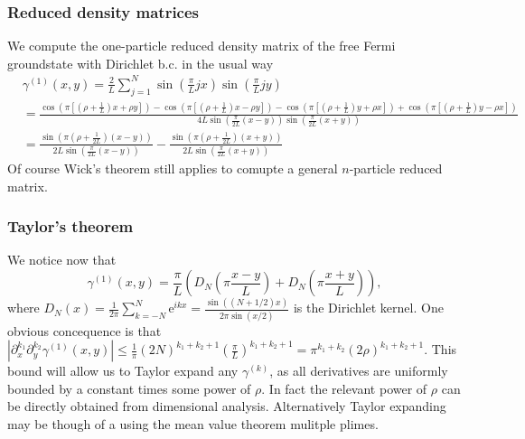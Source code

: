 \documentclass[a4paper,11pt]{article}
\newcommand{\euler}[1]{\text{e}^{#1}}
\newcommand{\abs}[1]{\left\lvert #1 \right\rvert}
\numberwithin{equation}{section}
\begin{document}
	\subsubsection{Reduced density matrices}
	We compute the one-particle reduced density matrix of the free Fermi groundstate with Dirichlet b.c. in the usual way\begin{equation}
	\begin{aligned}
	&\gamma^{(1)}(x,y)=\frac{2}{L}\sum_{j=1}^{N}\sin\left(\frac{\pi}{L}jx\right)\sin\left(\frac{\pi}{L} jy\right)\\
	&=\frac{\cos\left(\pi\left[ \left(\rho+\frac{1}{L}\right)x+\rho y\right]\right)-\cos\left(\pi \left[\left(\rho+\frac{1}{L}\right)x-\rho y\right]\right)-\cos\left(\pi \left[\left(\rho+\frac{1}{L}\right)y+\rho x\right]\right)+\cos\left(\pi \left[\left(\rho+\frac{1}{L}\right)y-\rho x\right]\right)}{4L\sin\left(\frac{\pi}{2L}(x-y)\right)\sin\left(\frac{\pi}{2L}(x+y)\right)}\\
	&=\frac{\sin\left(\pi\left(\rho+\frac{1}{2L}\right)(x-y)\right)}{2L\sin\left(\frac{\pi}{2L}(x-y)\right)}-\frac{\sin\left(\pi\left(\rho+\frac{1}{2L}\right)(x+y)\right)}{2L\sin\left(\frac{\pi}{2L}(x+y)\right)}
	\end{aligned}
	\end{equation}
	Of course Wick's theorem still applies to comupte a general $ n $-particle reduced matrix.
	\subsubsection{Taylor's theorem}
	We notice now that \begin{equation}
	\gamma^{(1)}(x,y)=\frac{\pi}{L}\left(D_{N}\left(\pi\frac{x-y}{L}\right)+D_{N}\left(\pi\frac{x+y}{L}\right)\right),
	\end{equation}
	where $ D_N(x)=\frac{1}{2\pi}\sum_{k=-N}^{N}\euler{ikx}=\frac{\sin((N+1/2)x)}{2\pi\sin(x/2)} $ is the Dirichlet kernel. One obvious concequence is that $ \abs{\partial_{x}^{k_1}\partial_{y}^{k_2}\gamma^{(1)}(x,y)}\leq \frac{1}{\pi}(2N)^{k_1+k_2+1}\left(\frac{\pi}{L}\right)^{k_1+k_2+1}=\pi^{k_1+k_2}(2\rho)^{k_1+k_2+1} $. This bound will allow us to Taylor expand any $ \gamma^{(k)} $, as all derivatives are uniformly bounded by a constant times some power of $ \rho $. In fact the relevant power of $ \rho $ can be directly obtained from dimensional analysis. Alternatively Taylor expanding may be though of a using the mean value theorem mulitple plimes.
\end{document}
